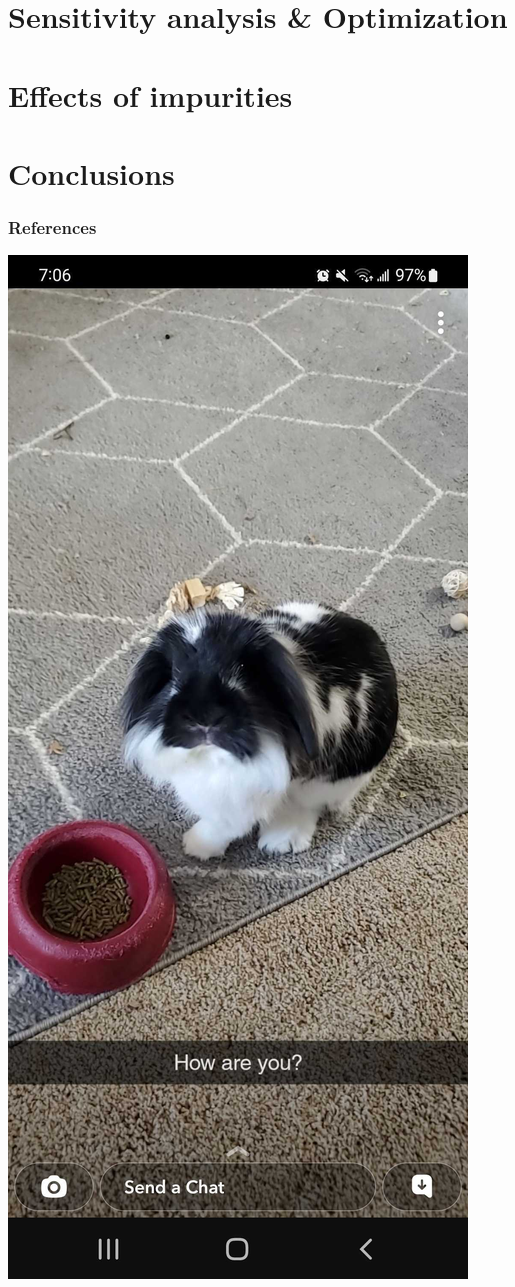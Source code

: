 \documentclass[9pt,xcolor={table}]{beamer}
\begin{document}
\section{Sensitivity analysis \& Optimization}

\section{Effects of impurities}

\section{Conclusions}




\begin{frame}[allowframebreaks]
    \frametitle{References}
    
    {\footnotesize  }
  
\end{frame}

\begin{frame}
    \centering
    \includegraphics[scale=0.25,trim=0 600 0 700,clip]{LittleR.jpg}
\end{frame}


\end{document}
